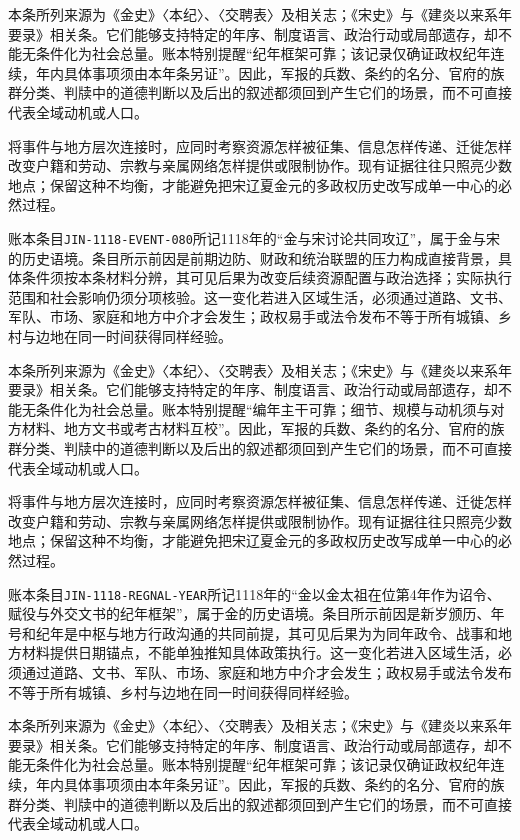 本条所列来源为《金史》〈本纪〉、〈交聘表〉及相关志；《宋史》与《建炎以来系年要录》相关条。它们能够支持特定的年序、制度语言、政治行动或局部遗存，却不能无条件化为社会总量。账本特别提醒“纪年框架可靠；该记录仅确证政权纪年连续，年内具体事项须由本年条另证”。因此，军报的兵数、条约的名分、官府的族群分类、判牍中的道德判断以及后出的叙述都须回到产生它们的场景，而不可直接代表全域动机或人口。

将事件与地方层次连接时，应同时考察资源怎样被征集、信息怎样传递、迁徙怎样改变户籍和劳动、宗教与亲属网络怎样提供或限制协作。现有证据往往只照亮少数地点；保留这种不均衡，才能避免把宋辽夏金元的多政权历史改写成单一中心的必然过程。

账本条目\texttt{JIN-1118-EVENT-080}所记1118年的“金与宋讨论共同攻辽”，属于金与宋的历史语境。条目所示前因是前期边防、财政和统治联盟的压力构成直接背景，具体条件须按本条材料分辨，其可见后果为改变后续资源配置与政治选择；实际执行范围和社会影响仍须分项核验。这一变化若进入区域生活，必须通过道路、文书、军队、市场、家庭和地方中介才会发生；政权易手或法令发布不等于所有城镇、乡村与边地在同一时间获得同样经验。

本条所列来源为《金史》〈本纪〉、〈交聘表〉及相关志；《宋史》与《建炎以来系年要录》相关条。它们能够支持特定的年序、制度语言、政治行动或局部遗存，却不能无条件化为社会总量。账本特别提醒“编年主干可靠；细节、规模与动机须与对方材料、地方文书或考古材料互校”。因此，军报的兵数、条约的名分、官府的族群分类、判牍中的道德判断以及后出的叙述都须回到产生它们的场景，而不可直接代表全域动机或人口。

将事件与地方层次连接时，应同时考察资源怎样被征集、信息怎样传递、迁徙怎样改变户籍和劳动、宗教与亲属网络怎样提供或限制协作。现有证据往往只照亮少数地点；保留这种不均衡，才能避免把宋辽夏金元的多政权历史改写成单一中心的必然过程。

账本条目\texttt{JIN-1118-REGNAL-YEAR}所记1118年的“金以金太祖在位第4年作为诏令、赋役与外交文书的纪年框架”，属于金的历史语境。条目所示前因是新岁颁历、年号和纪年是中枢与地方行政沟通的共同前提，其可见后果为为同年政令、战事和地方材料提供日期锚点，不能单独推知具体政策执行。这一变化若进入区域生活，必须通过道路、文书、军队、市场、家庭和地方中介才会发生；政权易手或法令发布不等于所有城镇、乡村与边地在同一时间获得同样经验。

本条所列来源为《金史》〈本纪〉、〈交聘表〉及相关志；《宋史》与《建炎以来系年要录》相关条。它们能够支持特定的年序、制度语言、政治行动或局部遗存，却不能无条件化为社会总量。账本特别提醒“纪年框架可靠；该记录仅确证政权纪年连续，年内具体事项须由本年条另证”。因此，军报的兵数、条约的名分、官府的族群分类、判牍中的道德判断以及后出的叙述都须回到产生它们的场景，而不可直接代表全域动机或人口。

